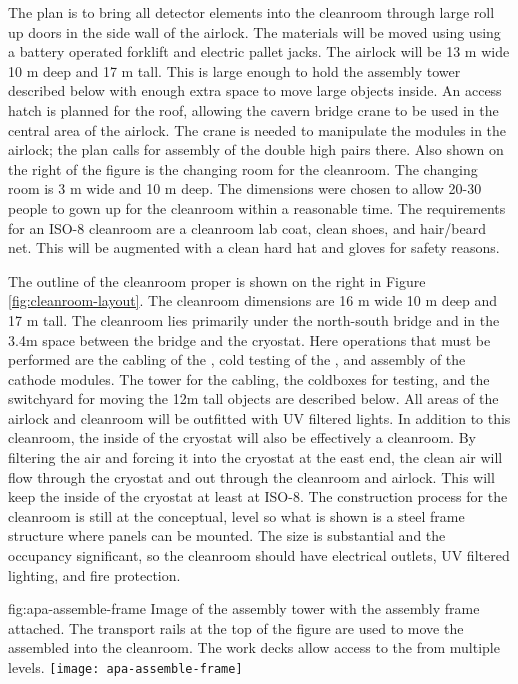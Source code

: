The plan is to bring all detector elements into the cleanroom through large roll up doors in the side wall of the airlock. The materials will be moved using using  a battery operated forklift and electric pallet jacks. The airlock will be  13 \si{m} wide 10 \si{m} deep and 17 \si{m} tall. This is large enough to hold the  assembly tower described below with enough extra space to move large objects inside. An access hatch is planned for the roof, allowing the cavern bridge crane to be used in the central area of the airlock. The crane is needed to manipulate the  modules in the airlock; the plan calls for assembly of the double high  pairs there. Also shown on the right of the figure is the changing room for the cleanroom. The changing room is 3 \si{m} wide and 10 \si{m} deep. The dimensions were chosen to allow 20-30 people to gown up for the cleanroom within a reasonable time. The requirements for an ISO-8 cleanroom are a cleanroom lab coat, clean shoes, and hair/beard net. This will be augmented with a clean hard hat and gloves for safety reasons. 

The outline of the cleanroom proper is shown on the right in Figure \ref{fig:cleanroom-layout}. The cleanroom dimensions are 16 \si{m} wide 10 \si{m} deep and 17 \si{m} tall. The cleanroom lies primarily under the north-south bridge and in the 3.4m space between the bridge and the cryostat. Here operations that must be performed are the cabling of the , cold testing of the , and assembly of the cathode  modules. The tower for the  cabling, the coldboxes for testing, and the switchyard for moving the 12m tall objects are described below. All areas of the airlock and cleanroom will be outfitted with UV filtered lights. In addition to this cleanroom, the inside of the cryostat will also be effectively a cleanroom.  By filtering the air and forcing it  into the cryostat at the east end, the clean air will flow through the cryostat and out through the cleanroom and airlock. This will keep the inside of the cryostat at least at ISO-8. The construction process for the cleanroom is still at the conceptual, level so what is shown is a steel frame structure where panels can be mounted. The size is substantial and the occupancy significant, so the cleanroom should have electrical outlets, UV filtered lighting, and fire protection. 


\begin{dunefigure}{fig:apa-assemble-frame}
  {Image of the  assembly tower with the  assembly frame attached. The transport rails at the top of the figure are used to move the assembled  into the cleanroom. The work decks allow access to the  from multiple levels. }
\texttt{[image: apa-assemble-frame]}
\end{dunefigure}

